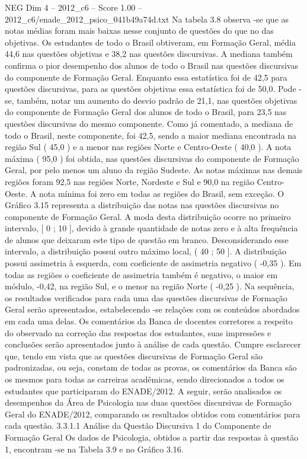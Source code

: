 \begin{textsample}{NEG Dim 4 – 2012\_c6 – Score 1.00 – 2012\_c6/enade\_2012\_psico\_041b49a74d.txt}
Na tabela 3.8 observa -se que as notas médias foram mais baixas nesse conjunto de questões do que no das objetivas.
Os estudantes de todo o Brasil obtiveram, em Formação Geral, média 44,6 nas questões objetivas e 38,2 nas questões discursivas.
A mediana também confirma o pior desempenho dos alunos de todo o Brasil nas questões discursivas do componente de Formação Geral.
Enquanto essa estatística foi de 42,5 para questões discursivas, para as questões objetivas essa estatística foi de 50,0.
Pode -se, também, notar um aumento do desvio padrão de 21,1, nas questões objetivas do componente de Formação Geral dos alunos de todo o Brasil, para 23,5 nas questões discursivas do mesmo componente.
Como já comentado, a mediana de todo o Brasil, neste componente, foi 42,5, sendo a maior mediana encontrada na região Sul ( 45,0 ) e a menor nas regiões Norte e Centro-Oeste ( 40,0 ).
A nota máxima ( 95,0 ) foi obtida, nas questões discursivas do componente de Formação Geral, por pelo menos um aluno da região Sudeste.
As notas máximas nas demais regiões foram 92,5 nas regiões Norte, Nordeste e Sul e 90,0 na região Centro-Oeste.
A nota mínima foi zero em todas as regiões do Brasil, sem exceção.
O Gráfico 3.15 representa a distribuição das notas nas questões discursivas no componente de Formação Geral.
A moda desta distribuição ocorre no primeiro intervalo, [ 0 ; 10 ], devido à grande quantidade de notas zero e à alta frequência de alunos que deixaram este tipo de questão em branco.
Desconsiderando esse intervalo, a distribuição possui outro máximo local, ( 40 ; 50 ].
A distribuição possui assimetria à esquerda, com coeficiente de assimetria negativo ( -0,35 ).
Em todas as regiões o coeficiente de assimetria também é negativo, o maior em módulo, -0,42, na região Sul, e o menor na região Norte ( -0,25 ).
Na sequência, os resultados verificados para cada uma das questões discursivas de Formação Geral serão apresentados, estabelecendo -se relações com os conteúdos abordados em cada uma delas.
Os comentários da Banca de docentes corretores a respeito do observado na correção das respostas dos estudantes, suas impressões e conclusões serão apresentados junto à análise de cada questão.
Cumpre esclarecer que, tendo em vista que as questões discursivas de Formação Geral são padronizadas, ou seja, constam de todas as provas, os comentários da Banca são os mesmos para todas as carreiras acadêmicas, sendo direcionados a todos os estudantes que participaram do ENADE/2012.
A seguir, serão analisados os desempenhos da Área de Psicologia nas duas questões discursivas de Formação Geral do ENADE/2012, comparando os resultados obtidos com comentários para cada questão. 3.3.1.1 Análise da Questão Discursiva 1 do Componente de Formação Geral Os dados de Psicologia, obtidos a partir das respostas à questão 1, encontram -se na Tabela 3.9 e no Gráfico 3.16.

\end{textsample}
